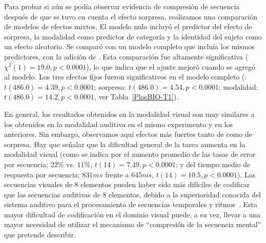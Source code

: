Para probar si aún se podía observar evidencia de compresión de secuencia después de que se tuvo en cuenta el efecto sorpresa, realizamos una comparación de modelos de efectos mixtos. El modelo nulo incluyó el predictor del efecto de sorpresa, la modalidad como predictor de categoría y la identidad del sujeto como un efecto aleatorio. Se comparó con un modelo completo que incluía los mismos predictores, con la adición de \mdlbin. Esta comparación fue altamente significativa ($\chi^2 (1) = 19.0, p < 0.0001$), lo que indica que el ajuste mejoró cuando se agregó \mdlbin al modelo. Los tres efectos fijos fueron significativos en el modelo completo (\mdlbin: $t (486.0) = 4.39, p < 0.0001$; sorpresa: $t (486.0) = 4.54, p < 0.0001$; modalidad: $t (486.0) = 14.2, p <0.0001$, ver Tabla~\ref{PlosBIO-T1}).


En general, los resultados obtenidos en la modalidad visual son muy similares a los obtenidos en la modalidad auditiva en el mismo experimento y en los anteriores. Sin embargo, observamos aquí efectos más fuertes tanto de \mdlbin como de sorpresa. Hay que señalar que la dificultad general de la tarea aumenta en la modalidad visual (como se indica por el aumento promedio de las tasas de error por secuencia; $22\%$ vs. $11 \%$, $t (14) = 7.49, p < 0.0001$; y del tiempo medio de respuesta por secuencia; $831ms$ frente a $645ms$, $t(14) = 10.5, p < 0.0001$). Las secuencias visuales de 8 elementos pueden haber sido más difíciles de codificar que las secuencias auditivas de 8 elementos, debido a la superioridad conocida del sistema auditivo para el procesamiento de secuencias temporales y ritmos~\cite{f90,f92}. Esta mayor dificultad de codificación en el dominio visual puede, a su vez, llevar a una mayor necesidad de utilizar el mecanismo de ``compresión de la secuencia mental'' que \grambin pretende describir.

